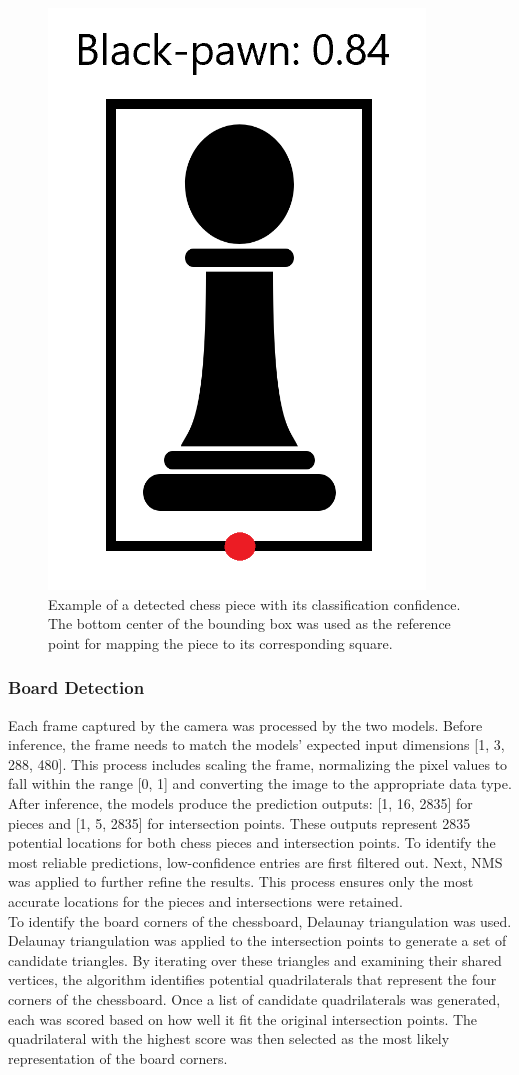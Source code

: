 

\begin{figure}[h!]
    \centering
    \includegraphics[width=0.25\linewidth]{figures/methods/ml-models/black-pawn.png}
    \caption[FIX]{Example of a detected chess piece with its classification confidence. The bottom center of the bounding box was used as the reference point for mapping the piece to its corresponding square. \cite{svgrepo:black-pawn-svg}}
    \label{fig:bbox-black-pawn}
\end{figure}


\subsubsection*{Board Detection}

Each frame captured by the camera was processed by the two models. Before inference, the frame needs to match the models’ expected input dimensions [1, 3, 288, 480]. This process includes scaling the frame, normalizing the pixel values to fall within the range [0, 1] and converting the image to the appropriate data type. \\

After inference, the models produce the prediction outputs: [1, 16, 2835] for pieces and [1, 5, 2835] for intersection points. These outputs represent 2835 potential locations for both chess pieces and intersection points. To identify the most reliable predictions, low-confidence entries are first filtered out. Next, NMS was applied to further refine the results. This process ensures only the most accurate locations for the pieces and intersections were retained. \\

To identify the board corners of the chessboard, Delaunay triangulation was used. Delaunay triangulation was applied to the intersection points to generate a set of candidate triangles. By iterating over these triangles and examining their shared vertices, the algorithm identifies potential quadrilaterals that represent the four corners of the chessboard. Once a list of candidate quadrilaterals was generated, each was scored based on how well it fit the original intersection points. The quadrilateral with the highest score was then selected as the most likely representation of the board corners.
\\

